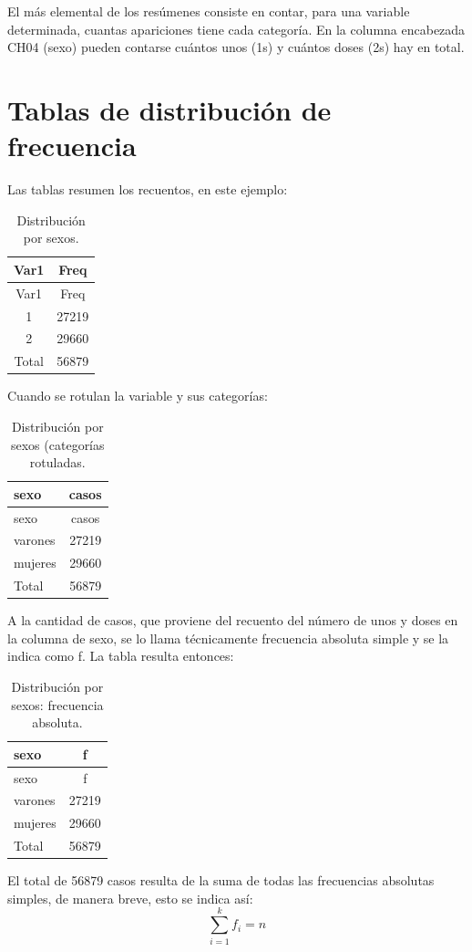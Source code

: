 \documentclass[]{book}
\begin{document}
El más elemental de los resúmenes consiste en contar, para una variable determinada, cuantas apariciones tiene cada categoría. En la columna encabezada CH04 (sexo) pueden contarse cuántos unos (1s) y cuántos doses (2s) hay en total.

\hypertarget{tablas-de-distribucion-de-frecuencia}{%
\section{Tablas de distribución de frecuencia}\label{tablas-de-distribucion-de-frecuencia}}

Las tablas resumen los recuentos, en este ejemplo:

\begin{longtable}[]{@{}cc@{}}
\caption{\label{tab:unnamed-chunk-19}Distribución por sexos.}\tabularnewline
\toprule
Var1 & Freq\tabularnewline
\midrule
\endfirsthead
\toprule
Var1 & Freq\tabularnewline
\midrule
\endhead
1 & 27219\tabularnewline
2 & 29660\tabularnewline
Total & 56879\tabularnewline
\bottomrule
\end{longtable}

Cuando se rotulan la variable y sus categorías:

\begin{longtable}[]{@{}lc@{}}
\caption{\label{tab:unnamed-chunk-20}Distribución por sexos (categorías rotuladas.}\tabularnewline
\toprule
sexo & casos\tabularnewline
\midrule
\endfirsthead
\toprule
sexo & casos\tabularnewline
\midrule
\endhead
varones & 27219\tabularnewline
mujeres & 29660\tabularnewline
Total & 56879\tabularnewline
\bottomrule
\end{longtable}

A la cantidad de casos, que proviene del recuento del número de unos y doses en la columna de sexo, se lo llama técnicamente frecuencia absoluta simple y se la indica como f. La tabla resulta entonces:

\begin{longtable}[]{@{}lc@{}}
\caption{\label{tab:unnamed-chunk-21}Distribución por sexos: frecuencia absoluta.}\tabularnewline
\toprule
sexo & f\tabularnewline
\midrule
\endfirsthead
\toprule
sexo & f\tabularnewline
\midrule
\endhead
varones & 27219\tabularnewline
mujeres & 29660\tabularnewline
Total & 56879\tabularnewline
\bottomrule
\end{longtable}

El total de 56879 casos resulta de la suma de todas las frecuencias absolutas simples, de manera breve, esto se indica así: \[\sum_{i=1}^{k}f_i =n\]
\end{document}
